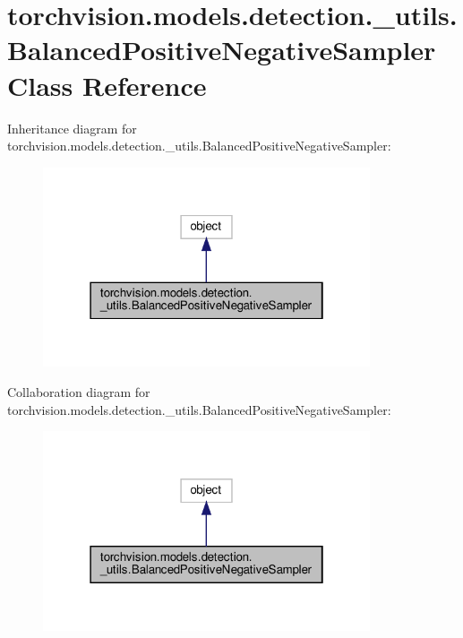 \hypertarget{classtorchvision_1_1models_1_1detection_1_1__utils_1_1BalancedPositiveNegativeSampler}{}\section{torchvision.\+models.\+detection.\+\_\+utils.\+Balanced\+Positive\+Negative\+Sampler Class Reference}
\label{classtorchvision_1_1models_1_1detection_1_1__utils_1_1BalancedPositiveNegativeSampler}


Inheritance diagram for torchvision.\+models.\+detection.\+\_\+utils.\+Balanced\+Positive\+Negative\+Sampler\+:
\nopagebreak
\begin{figure}[H]
\begin{center}
\leavevmode
\includegraphics[width=274pt]{classtorchvision_1_1models_1_1detection_1_1__utils_1_1BalancedPositiveNegativeSampler__inherit__graph}
\end{center}
\end{figure}


Collaboration diagram for torchvision.\+models.\+detection.\+\_\+utils.\+Balanced\+Positive\+Negative\+Sampler\+:
\nopagebreak
\begin{figure}[H]
\begin{center}
\leavevmode
\includegraphics[width=274pt]{classtorchvision_1_1models_1_1detection_1_1__utils_1_1BalancedPositiveNegativeSampler__coll__graph}
\end{center}
\end{figure}
